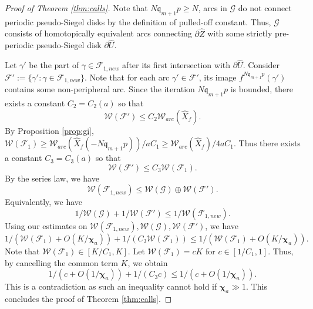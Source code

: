 \documentclass[11pt, reqno]{amsart}
\numberwithin{equation}{section}
\theoremstyle{plain}
\theoremstyle{theorem}
\theoremstyle{plain}
\theoremstyle{definition}
\numberwithin{figure}{section}
\begin{document}
\begin{proof}[Proof of Theorem \ref{thm:calls}]
Note that $N\mathfrak{q}_{m+1}p \geq N$, arcs in $\mathcal{G}$ do not connect periodic pseudo-Siegel disks by the definition of pulled-off constant. 
Thus, $\mathcal{G}$ consists of homotopically equivalent arcs connecting $\partial \widehat Z$ with some strictly pre-periodic pseudo-Siegel disk $\partial \widehat U$.

Let $\gamma'$ be the part of $\gamma \in \mathcal{F}_{1,new}$ after its first intersection with $\partial \widehat U$.
Consider $\mathcal{F'}:= \{\gamma': \gamma \in \mathcal{F}_{1, new}\}$.
Note that for each arc $\gamma' \in \mathcal{F'}$, its image $f^{N\mathfrak{q}_{m+1}p}(\gamma')$ contains some non-peripheral arc.
Since the iteration $N\mathfrak{q}_{m+1}p$ is bounded, there exists a constant $C_2 = C_2(a)$ so that 
$$
\mathcal{W}(\mathcal{F}') \leq C_2 \mathcal{W}_{arc}(\widehat X_f).
$$
By Proposition \ref{prop:gi}, $\mathcal{W}(\mathcal{F}_1)  \geq \mathcal{W}_{arc}(\widehat X_f
(-N\mathfrak{q}_{m+1}p))/aC_1 \geq \mathcal{W}_{arc}(\widehat X_f
)/4aC_1$.
Thus there exists a constant $C_3 = C_3(a)$ so that
$$
\mathcal{W}(\mathcal{F}') \leq C_3 \mathcal{W}(\mathcal{F}_1).
$$
By the series law, we have
$$
\mathcal{W}(\mathcal{F}_{1,new}) \leq \mathcal{W}(\mathcal{G}) \oplus \mathcal{W}(\mathcal{F}').
$$
Equivalently, we have
$$
1/\mathcal{W}(\mathcal{G}) + 1/ \mathcal{W}(\mathcal{F}') \leq 1/\mathcal{W}(\mathcal{F}_{1,new}).
$$
Using our estimates on $\mathcal{W}(\mathcal{F}_{1,new}), \mathcal{W}(\mathcal{G}), \mathcal{W}(\mathcal{F}')$, we have
$$
1/(\mathcal{W}(\mathcal{F}_1)+O(K/\boldsymbol{\chi}_a)) + 1/(C_3 \mathcal{W}(\mathcal{F}_1)) \leq 1/ (\mathcal{W}(\mathcal{F}_1)+O(K/\boldsymbol{\chi}_a)).
$$
Note that $\mathcal{W}(\mathcal{F}_1) \in [K/C_1, K]$.
Let $\mathcal{W}(\mathcal{F}_1) = cK$ for $c \in [1/C_1, 1]$.
Thus, by cancelling the common term $K$, we obtain
$$
1/(c+O(1/\boldsymbol{\chi}_a)) + 1/(C_3 c) \leq 1/ (c+O(1/\boldsymbol{\chi}_a)).
$$
This is a contradiction as such an inequality cannot hold if $\boldsymbol{\chi}_a \gg 1$.
This concludes the proof of Theorem \ref{thm:calls}.
\end{proof}
\end{document}
